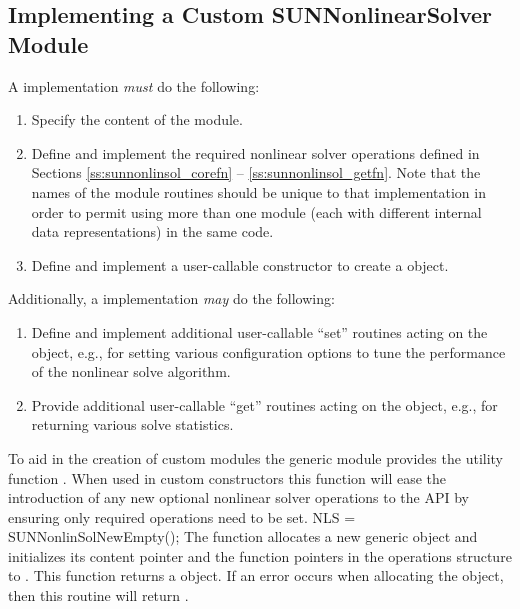 \subsection{Implementing a Custom SUNNonlinearSolver Module}
\label{ss:sunnonlinsol_custom}

A {\sunnonlinsol} implementation \textit{must} do the following:
\begin{enumerate}
\item Specify the content of the {\sunnonlinsol} module.
\item Define and implement the required nonlinear solver operations
  defined in Sections \ref{ss:sunnonlinsol_corefn}
  -- \ref{ss:sunnonlinsol_getfn}. Note that the names of the module
  routines should be unique to that implementation in order to permit
  using more than one {\sunnonlinsol} module (each with different
   internal data representations) in
  the same code.
\item Define and implement a user-callable constructor to create a
   object.
\end{enumerate}
Additionally, a  implementation \textit{may} do
the following:
\begin{enumerate}
\item Define and implement additional user-callable ``set''
  routines acting on the  object, e.g., for
  setting various configuration options to tune the performance of
  the nonlinear solve algorithm.
\item Provide additional user-callable ``get'' routines acting on the
   object, e.g., for returning various solve
  statistics.
\end{enumerate}

To aid in the creation of custom {\sunnonlinsol} modules the generic
{\sunnonlinsol} module provides the utility function .
When used in custom {\sunnonlinsol} constructors this function will ease the
introduction of any new optional nonlinear solver operations to the
{\sunnonlinsol} API by ensuring only required operations need to be set.
%
%
{
  NLS = SUNNonlinSolNewEmpty();
}
{
  The function  allocates a new generic {\sunnonlinsol}
  object and initializes its content pointer and the function pointers in the
  operations structure to .
}
{}
{
  This function returns a  object. If an error occurs when
  allocating the object, then this routine will return .
}
{}


